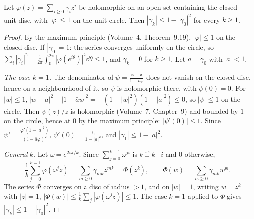 \begin{lemma}\label{conjectures:lem:coef}
Let $\varphi(z)=\sum_{i\ge0}\gamma_iz^i$ be holomorphic on an open set containing the closed unit disc, with $|\varphi|\le1$ on the unit circle. Then
$|\gamma_k|\le1-|\gamma_0|^2$ for every $k\ge1$.
\end{lemma}
\begin{proof}
By the maximum principle (Volume~4, Theorem~9.19), $|\varphi|\le1$ on the closed disc. If $|\gamma_0|=1$: the series converges uniformly on the circle, so
$\sum_i|\gamma_i|^2=\frac1{2\pi}\int_0^{2\pi}|\varphi(e^{i\theta})|^2\dd\theta\le1$, and $\gamma_k=0$ for $k\ge1$. Let $a=\gamma_0$ with $|a|<1$.

\emph{The case $k=1$.} The denominator of $\psi=\frac{\varphi-a}{1-\bar a\varphi}$ does not vanish on the closed disc, hence on a neighbourhood of it, so
$\psi$ is holomorphic there, with $\psi(0)=0$. For $|w|\le1$, $|w-a|^2-|1-\bar aw|^2=-(1-|w|^2)(1-|a|^2)\le0$, so $|\psi|\le1$ on the circle. Then
$\psi(z)/z$ is holomorphic (Volume~7, Chapter~9) and bounded by $1$ on the circle, hence at $0$ by the maximum principle: $|\psi'(0)|\le1$. Since
$\psi'=\frac{\varphi'(1-|a|^2)}{(1-\bar a\varphi)^2}$, $\psi'(0)=\frac{\gamma_1}{1-|a|^2}$, and $|\gamma_1|\le1-|a|^2$.

\emph{General $k$.} Let $\omega=e^{2i\pi/k}$. Since $\sum_{j=0}^{k-1}\omega^{ji}$ is $k$ if $k\mid i$ and $0$ otherwise,
\[
\frac1k\sum_{j=0}^{k-1}\varphi(\omega^jz)=\sum_{m\ge0}\gamma_{mk}z^{mk}=\Phi(z^k),\qquad\Phi(w)=\sum_{m\ge0}\gamma_{mk}w^m.
\]
The series $\Phi$ converges on a disc of radius $>1$, and on $|w|=1$, writing $w=z^k$ with $|z|=1$, $|\Phi(w)|\le\frac1k\sum_j|\varphi(\omega^jz)|\le1$.
The case $k=1$ applied to $\Phi$ gives $|\gamma_k|\le1-|\gamma_0|^2$.
\end{proof}

